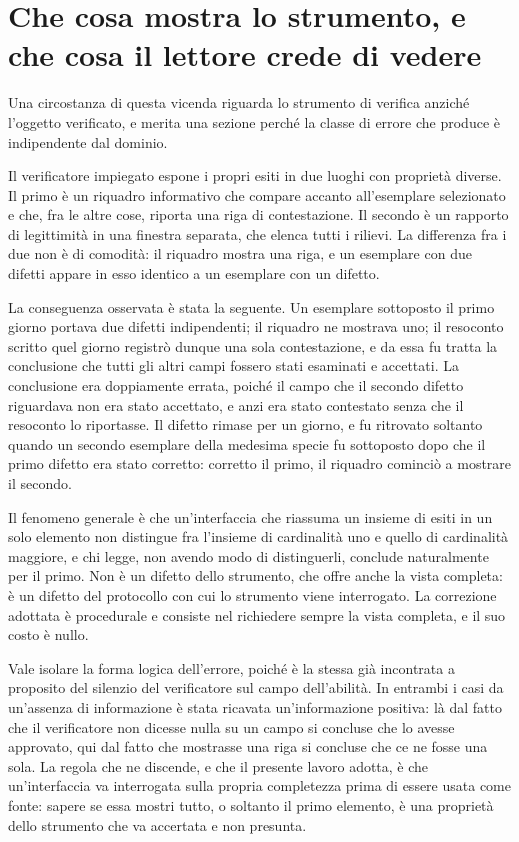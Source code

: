\section{Che cosa mostra lo strumento, e che cosa il lettore crede di vedere}

Una circostanza di questa vicenda riguarda lo strumento di verifica anziché l'oggetto verificato, e merita una sezione perché la classe di errore che produce è indipendente dal dominio.

Il verificatore impiegato espone i propri esiti in due luoghi con proprietà diverse. Il primo è un riquadro informativo che compare accanto all'esemplare selezionato e che, fra le altre cose, riporta una riga di contestazione. Il secondo è un rapporto di legittimità in una finestra separata, che elenca tutti i rilievi. La differenza fra i due non è di comodità: il riquadro mostra una riga, e un esemplare con due difetti appare in esso identico a un esemplare con un difetto.

La conseguenza osservata è stata la seguente. Un esemplare sottoposto il primo giorno portava due difetti indipendenti; il riquadro ne mostrava uno; il resoconto scritto quel giorno registrò dunque una sola contestazione, e da essa fu tratta la conclusione che tutti gli altri campi fossero stati esaminati e accettati. La conclusione era doppiamente errata, poiché il campo che il secondo difetto riguardava non era stato accettato, e anzi era stato contestato senza che il resoconto lo riportasse. Il difetto rimase per un giorno, e fu ritrovato soltanto quando un secondo esemplare della medesima specie fu sottoposto dopo che il primo difetto era stato corretto: corretto il primo, il riquadro cominciò a mostrare il secondo.

Il fenomeno generale è che un'interfaccia che riassuma un insieme di esiti in un solo elemento non distingue fra l'insieme di cardinalità uno e quello di cardinalità maggiore, e chi legge, non avendo modo di distinguerli, conclude naturalmente per il primo. Non è un difetto dello strumento, che offre anche la vista completa: è un difetto del protocollo con cui lo strumento viene interrogato. La correzione adottata è procedurale e consiste nel richiedere sempre la vista completa, e il suo costo è nullo.

Vale isolare la forma logica dell'errore, poiché è la stessa già incontrata a proposito del silenzio del verificatore sul campo dell'abilità. In entrambi i casi da un'assenza di informazione è stata ricavata un'informazione positiva: là dal fatto che il verificatore non dicesse nulla su un campo si concluse che lo avesse approvato, qui dal fatto che mostrasse una riga si concluse che ce ne fosse una sola. La regola che ne discende, e che il presente lavoro adotta, è che un'interfaccia va interrogata sulla propria completezza prima di essere usata come fonte: sapere se essa mostri tutto, o soltanto il primo elemento, è una proprietà dello strumento che va accertata e non presunta.

